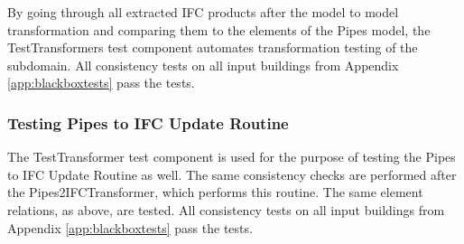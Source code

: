 By going through all extracted IFC products after the model to model transformation and comparing them to the elements of the Pipes model, the TestTransformers test component automates transformation testing of the subdomain. All consistency tests on all input buildings from Appendix \ref{app:blackboxtests} pass the tests.

\subsubsection{Testing Pipes to IFC Update Routine}
The TestTransformer test component is used for the purpose of testing the Pipes to IFC Update Routine as well. The same consistency checks are performed after the Pipes2IFCTransformer, which performs this routine. The same element relations, as above, are tested. All consistency tests on all input buildings from Appendix \ref{app:blackboxtests} pass the tests.





